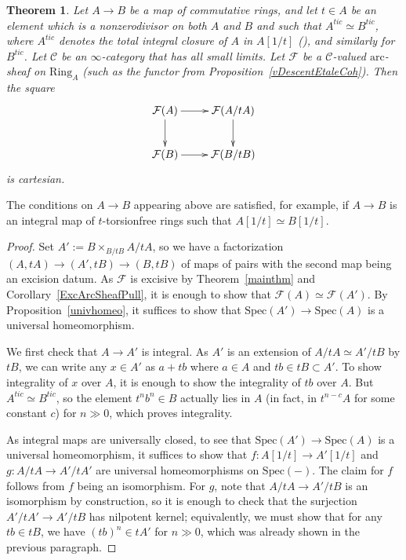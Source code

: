 \documentclass[reqno]{amsart}
\newcommand{\arc}{\mathrm{arc}}
\newtheorem{theorem}{Theorem}[section]
\theoremstyle{definition}
\begin{document}
	

\begin{theorem}
\label{TICarc}
Let $A \to B$ be a map of commutative rings, and let $t \in A$ be an element
which is a nonzerodivisor on both $A$ and $B$ and such that $A^{tic} \simeq
B^{tic}$, where $A^{tic}$ denotes the total integral closure of $A$ in $A[1/t]$
(), and similarly for $B^{tic}$. 
Let $\mathcal{C}$ be an $\infty$-category that has all small limits. 
Let $\mathcal{F}$ be a $\mathcal{C}$-valued  $\arc$-sheaf on $\mathrm{Ring}_A$ (such as the functor from Proposition~\ref{vDescentEtaleCoh}). Then the square
\[ \xymatrix{\mathcal{F}(A) \ar[r] \ar[d] & \mathcal{F}(A/tA) \ar[d] \\
		  \mathcal{F}(B) \ar[r] & \mathcal{F}(B/tB) }\]
is cartesian. 
\end{theorem}

The conditions on $A \to B$ appearing above are satisfied, for example, if $A \to B$ is an integral map of $t$-torsionfree rings such that $A[1/t] \simeq B[1/t]$. 

\begin{proof}
Set $A' := B \times_{B/tB} A/tA$, so we have a factorization $(A,tA) \to (A',tB)
\to (B,tB)$ of maps of pairs with the second map being an excision datum. As
$\mathcal{F}$ is excisive by Theorem~\ref{mainthm} and
Corollary~\ref{ExcArcSheafPull}, it is enough to show that $\mathcal{F}(A) \simeq \mathcal{F}(A')$.  By Proposition~\ref{univhomeo}, it suffices to show that $\mathrm{Spec}(A') \to \mathrm{Spec}(A)$ is a universal homeomorphism. 

We first check that $A \to A'$ is integral. As $A'$ is an extension of $A/tA \simeq A'/tB$ by $tB$, we can write any $x \in A'$ as $a + tb$ where $a \in A$ and $tb \in tB \subset A'$. To show integrality of $x$ over $A$, it is enough to show the integrality of $tb$ over $A$. But $A^{tic} \simeq B^{tic}$, so the element $t^n b^n \in B$ actually lies in $A$ (in fact, in $t^{n-c}A$ for some constant $c$) for $n \gg 0$, which proves integrality. 

As integral maps are universally closed, to see that $\mathrm{Spec}(A') \to
\mathrm{Spec}(A)$ is a universal homeomorphism, it suffices to show that
$f\colon A[1/t] \to A'[1/t]$ and $g\colon A/tA \to A'/tA'$ are universal
homeomorphisms on $\mathrm{Spec}(-)$. The claim for $f$ follows from $f$ being an isomorphism. For $g$, note that $A/tA \to A'/tB$ is an isomorphism by construction, so it is enough to check that the surjection $A'/tA' \to A'/tB$ has nilpotent kernel; equivalently, we must show that for any $tb \in tB$, we have $(tb)^n \in tA'$ for $n \gg 0$, which was already shown in the previous paragraph. 
\end{proof}
\end{document}
